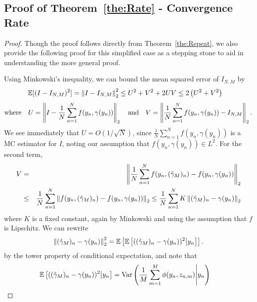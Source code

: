 
\subsection{Proof of Theorem~\ref{the:Rate} - Convergence Rate}
\label{sec:app:rate_single}

\theRate*

\begin{proof}
	Though the proof follows directly from Theorem~\ref{the:Repeat}, we also provide the following proof 
	for this simplified case as a stepping stone to aid in understanding the more general proof.
	
	Using Minkowski's inequality, we can bound the mean squared error of $I_{N,M}$ by
	\begin{align} \label{eq:mse-bound-app}\begin{split}
	\mathbb{E}[(I-I_{N,M})^2] &= \left\lVert I - I_{N,M}\right\rVert_2^2 \leq {U}^2 + {V}^2 + 2 U V \leq 2\left(U^2 + V^2\right)
	\end{split}
	\end{align}
	\begin{eqnarray*}
		\text{where} \quad U = \left\lVert I - \frac{1}{N} \sum_{n=1}^N f(y_n, \gamma(y_n))\right\rVert_2
		\quad \text{and} \quad
		V = \left\lVert\frac{1}{N} \sum_{n=1}^N f(y_n, \gamma(y_n)) - I_{N,M}\right\rVert_2.
	\end{eqnarray*}
	We see immediately that $U = O\left(1 / \sqrt{N}\right)$, since $\frac{1}{N} \sum_{n=1}^N
	f(y_n, \gamma(y_n))$ is a MC estimator for $I$, noting our assumption that
	$f(y_n, \gamma(y_n)) \in L^2$. For the second term,
	\begin{eqnarray*}
		V &=& \left\lVert\frac{1}{N} \sum_{n=1}^N f(y_n, (\hat{\gamma}_M)_n) - f(y_n, \gamma(y_n))\right\rVert_2 \\
		&\leq& \frac{1}{N} \sum_{n=1}^{N} \left\lVert f(y_n, (\hat{\gamma}_M)_n) - f(y_n,
			\gamma(y_n))\right\rVert_2
		\leq \frac{1}{N} \sum_{n=1}^N K \left\lVert(\hat{\gamma}_M)_n - \gamma(y_n)\right\rVert_2 \\
	\end{eqnarray*}
	where $K$ is a fixed constant, again by Minkowski and using the assumption that $f$ is
	Lipschitz. We can rewrite
	\[
	\left\lVert(\hat{\gamma}_M)_n - \gamma(y_n)\right\rVert_2^2
	= \mathbb{E} \left[ \mathbb{E} \left[ ((\hat{\gamma}_M)_n - \gamma(y_n))^2 \middle| y_n \right]\right].
	\]
	by the tower property of conditional expectation, and note that
	\begin{align*}
	\E &\left[ ((\hat{\gamma}_M)_n - \gamma(y_n))^2 \middle| y_n \right]
	= \var\left(\frac{1}{M} \sum_{m=1}^M \phi(y_n, z_{n,m}) \middle| y_n \right) 

\end{align*}
\end{proof}
